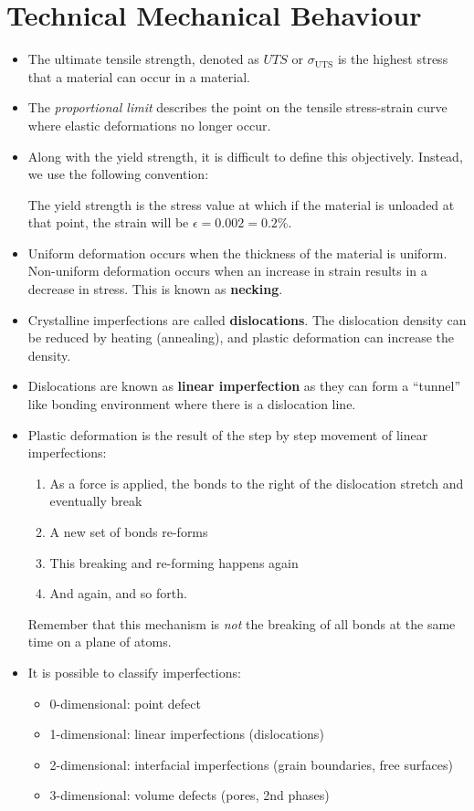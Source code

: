 \section{Technical Mechanical Behaviour}
\begin{itemize}
    \item The ultimate tensile strength, denoted as $UTS$ or $\sigma_\text{UTS}$ is the highest stress that a material can occur in a material.
    \item The \textit{proportional limit} describes the point on the tensile stress-strain curve where elastic deformations no longer occur.
    \item Along with the yield strength, it is difficult to define this objectively. Instead, we use the following convention:
    \begin{definition}
        The yield strength is the stress value at which if the material is unloaded at that point, the strain will be $\epsilon = 0.002 = 0.2\%$.
    \end{definition}
    \item Uniform deformation occurs when the thickness of the material is uniform. Non-uniform deformation occurs when an increase in strain results in a decrease in stress. This is known as \textbf{necking}.
    \item Crystalline imperfections are called \textbf{dislocations}. The dislocation density can be reduced by heating (annealing), and plastic deformation can increase the density.
    \item Dislocations are known as \textbf{linear imperfection} as they can form a ``tunnel'' like bonding environment where there is a dislocation line.
    \item Plastic deformation is the result of the step by step movement of linear imperfections:
    \begin{enumerate}
        \item As a force is applied, the bonds to the right of the dislocation stretch and eventually break
        \item A new set of bonds re-forms
        \item This breaking and re-forming happens again
        \item And again, and so forth.
    \end{enumerate}
    \begin{warning}
        Remember that this mechanism is \textit{not} the breaking of all bonds at the same time on a plane of atoms.
    \end{warning}
    \item It is possible to classify imperfections:
    \begin{itemize}
        \item 0-dimensional: point defect
        \item 1-dimensional: linear imperfections (dislocations)
        \item 2-dimensional: interfacial imperfections (grain boundaries, free surfaces)
        \item 3-dimensional: volume defects  (pores, 2nd phases)
    \end{itemize}

\end{itemize}
